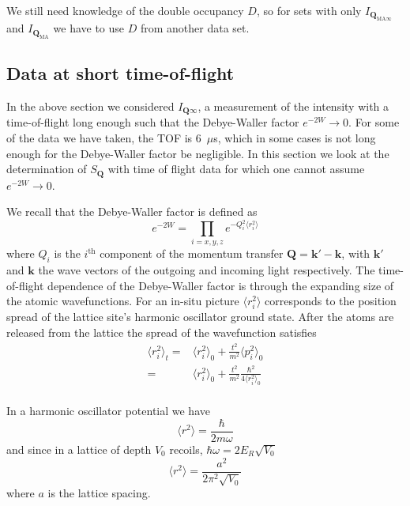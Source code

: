 \documentclass[11pt,letter]{article}
\newcommand{\bv}[1]{\ensuremath{\bm{#1}}}
\newcommand{\Iqtof}{\ensuremath{I_{\bv{Q}\infty} }}
\newcommand{\Iqma}{\ensuremath{I_{\bv{Q}_{\text{MA}}} }}
\newcommand{\Iqmatof}{\ensuremath{I_{\bv{Q}_{\text{MA}\infty}} }}
\begin{document}
We still need knowledge of the double occupancy $D$, so for sets with only
$\Iqmatof$ and $\Iqma$ we have to use $D$ from another data set.

\subsection{Data at short time-of-flight} 

In the above section we considered $\Iqtof$, a measurement of the intensity with
a time-of-flight long enough such that the Debye-Waller factor $e^{-2W}
\rightarrow 0 $.   For some of the data we have taken, the TOF is 6~$\mu$s,
which in some cases is not long enough for the Debye-Waller factor be
negligible.  In this section we look at the determination of $S_{\bv{Q}}$ with
time of flight data for which one cannot assume $e^{-2W} \rightarrow 0 $.  

We recall that the Debye-Waller factor is defined as
\begin{equation}
    e^{-2W} = 
      \prod_{i=x,y,z} e^{ -Q_{i}^{2}\langle r_{i} ^{2} \rangle } 
\end{equation}
where $Q_{i}$ is the $i^{\text{th}}$ component of the momentum transfer $\bv{Q}
= \bv{k}' - \bv{k}$,  with $\bv{k}'$ and $\bv{k}$ the wave vectors of the
outgoing and incoming light respectively.  The time-of-flight dependence of the
Debye-Waller factor is through the expanding size of the atomic wavefunctions.
For an in-situ picture $\langle r_{i}^{2}\rangle$ corresponds to the position
spread of the lattice site's harmonic oscillator ground state.  After the atoms
are released from the lattice the spread of the wavefunction satisfies 
\begin{equation}
\begin{split} 
  \langle r_{i}^{2} \rangle_{t} = &
   \langle r_{i}^{2} \rangle_{0} + 
  \frac{t^{2}}{m^{2}} \langle p_{i}^{2} \rangle_{0} \\
  = &  \langle r_{i}^{2} \rangle_{0} + 
  \frac{t^{2}}{m^{2}} \frac{\hbar^{2}}{4  \langle r_{i}^{2} \rangle_{0} } \\
\end{split}
\end{equation} 

In a harmonic oscillator potential we have 
\begin{equation}
    \langle r^{2} \rangle = \frac{\hbar}{2 m \omega}
\end{equation}
and since in a lattice of depth $V_{0}$ recoils,  $\hbar \omega = 2 E_{R}
\sqrt{V_{0}}$  
\begin{equation}
    \langle r^{2} \rangle = \frac{a^{2}}{ 2 \pi^{2} \sqrt{V_{0}} }
\end{equation}
where $a$ is the lattice spacing. 
\end{document}

